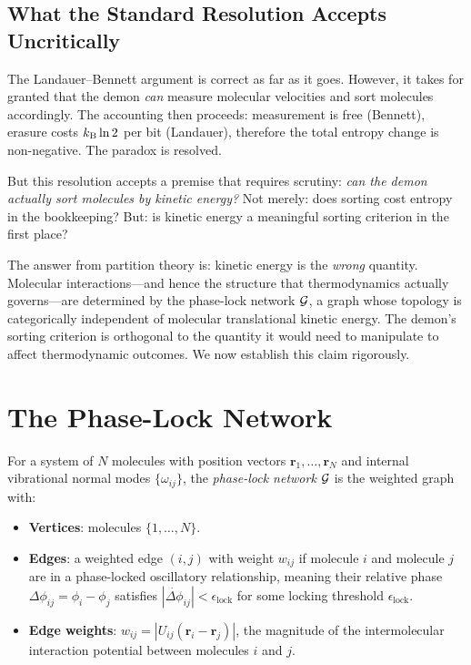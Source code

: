 \subsection{What the Standard Resolution Accepts Uncritically}

The Landauer--Bennett argument is correct as far as it goes. However, it takes
for granted that the demon \emph{can} measure molecular velocities and sort
molecules accordingly. The accounting then proceeds: measurement is free
(Bennett), erasure costs $k_{\mathrm{B}} \ln 2$ per bit (Landauer), therefore the total
entropy change is non-negative. The paradox is resolved.

But this resolution accepts a premise that requires scrutiny: \emph{can the
demon actually sort molecules by kinetic energy?} Not merely: does sorting
cost entropy in the bookkeeping? But: is kinetic energy a meaningful sorting
criterion in the first place?

The answer from partition theory is: kinetic energy is the \emph{wrong} quantity.
Molecular interactions---and hence the structure that thermodynamics actually
governs---are determined by the phase-lock network $\mathcal{G}$, a graph
whose topology is categorically independent of molecular translational kinetic
energy. The demon's sorting criterion is orthogonal to the quantity it would
need to manipulate to affect thermodynamic outcomes. We now establish this
claim rigorously.

\section{The Phase-Lock Network}
\label{sec:phase_lock_network}

\begin{definition}
\label{def:phase_lock_network}
For a system of $N$ molecules with position vectors $\mathbf{r}_1, \ldots, \mathbf{r}_N$
and internal vibrational normal modes $\{\omega_{ij}\}$, the \emph{phase-lock
network} $\mathcal{G}$ is the weighted graph with:
\begin{itemize}
  \item \textbf{Vertices}: molecules $\{1, \ldots, N\}$.
  \item \textbf{Edges}: a weighted edge $(i,j)$ with weight $w_{ij}$ if molecule
        $i$ and molecule $j$ are in a phase-locked oscillatory relationship,
        meaning their relative phase $\Delta\phi_{ij} = \phi_i - \phi_j$
        satisfies $|\dot{\Delta\phi}_{ij}| < \epsilon_{\mathrm{lock}}$ for some
        locking threshold $\epsilon_{\mathrm{lock}}$.
  \item \textbf{Edge weights}: $w_{ij} = |U_{ij}(\mathbf{r}_i - \mathbf{r}_j)|$,
        the magnitude of the intermolecular interaction potential between
        molecules $i$ and $j$.
\end{itemize}
\end{definition}

